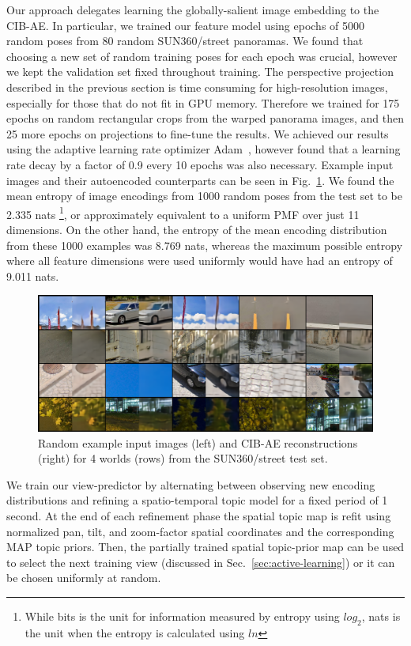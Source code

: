 Our approach delegates learning the globally-salient image embedding to the CIB-AE. In particular, we trained our feature model using epochs of 5000 random poses from 80 random SUN360/street panoramas. We found that choosing a new set of random training poses for each epoch was crucial, however we kept the validation set fixed throughout training. The perspective projection described in the previous section is time consuming for high-resolution images, especially for those that do not fit in GPU memory. Therefore we trained for 175 epochs on random rectangular crops from the warped panorama images, and then 25 more epochs on projections to fine-tune the results. We achieved our results using the adaptive learning rate optimizer Adam~\citep{KingmaAdam}, however found that a learning rate decay by a factor of 0.9 every 10 epochs was also necessary. Example input images and their autoencoded counterparts can be seen in Fig.~\ref{fig:cibae_encodings}. We found the mean entropy of image encodings from 1000 random poses from the test set to be 2.335 nats \footnote{While bits is the unit for information measured by entropy using $log_2$, nats is the unit when the entropy is calculated using $ln$}, or approximately equivalent to a uniform PMF over just 11 dimensions. On the other hand, the entropy of the mean encoding distribution from these 1000 examples was 8.769 nats, whereas the maximum possible entropy where all feature dimensions were used uniformly would have had an entropy of 9.011 nats.

\begin{figure}
    \centering
    \includegraphics[width=\textwidth]{figures/ptz/mc3ae_encodings}
    \caption{Random example input images (left) and CIB-AE reconstructions (right) for 4 worlds (rows) from the SUN360/street test set.}
    \label{fig:cibae_encodings}
\end{figure}

We train our view-predictor by alternating between observing new encoding distributions and refining a spatio-temporal topic model for a fixed period of 1 second. At the end of each refinement phase the spatial topic map is refit using normalized pan, tilt, and zoom-factor spatial coordinates and the corresponding MAP topic priors. Then, the partially trained spatial topic-prior map can be used to select the next training view (discussed in Sec.~\ref{sec:active-learning}) or it can be chosen uniformly at random.


